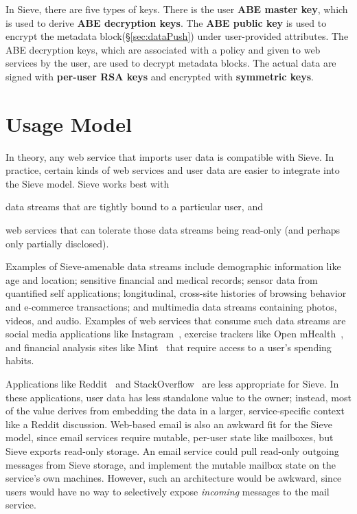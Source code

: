 In Sieve, there are five types of keys.
There is the user \textbf{ABE master key},
which is used to derive \textbf{ABE decryption keys}. The 
\textbf{ABE public key} is used to encrypt the metadata
block(\S\ref{sec:dataPush}) under user-provided
attributes. The ABE decryption keys, which are
associated with a policy and given to web 
services by the user, are used to decrypt
metadata blocks. The actual data are signed
with \textbf{per-user RSA keys} and encrypted
with \textbf{symmetric keys}.

\section{Usage Model}

In theory, any web service that imports
user data is compatible with Sieve. In
practice, certain kinds of web services
and user data are easier to integrate into
the Sieve model. Sieve works best with
  \begin{smitemize}
    \item data streams that are tightly
          bound to a particular user, and
    \item web services that can tolerate
          those data streams being read-only
          (and perhaps only partially disclosed).
  \end{smitemize}
Examples of Sieve-amenable data streams
include demographic information like age and
location; sensitive financial and medical
records; sensor data from quantified self
applications; longitudinal, cross-site
histories of browsing behavior and e-commerce
transactions; and multimedia data streams
containing photos, videos, and audio.
Examples of web services that consume such
data streams are social media applications
like Instagram~\cite{instagram}, 
exercise trackers like Open mHealth~\cite{omh}, 
and financial analysis sites like Mint~\cite{mint}
that require access to a user's spending habits.

Applications like Reddit~\cite{reddit} 
and StackOverflow~\cite{soverflow} are
less appropriate for Sieve. In these applications,
user data has less standalone value to the
owner; instead, most of the value derives from
embedding the data in a larger, service-specific
context like a Reddit discussion.
Web-based email is also an awkward fit for the
Sieve model, since email services require mutable,
per-user state like mailboxes, but Sieve exports
read-only storage. An email service could pull
read-only outgoing messages from Sieve storage,
and implement the mutable mailbox state on the
service's own machines. However, such an
architecture would be awkward, since users
would have no way to selectively expose
\emph{incoming} messages to the mail service.

